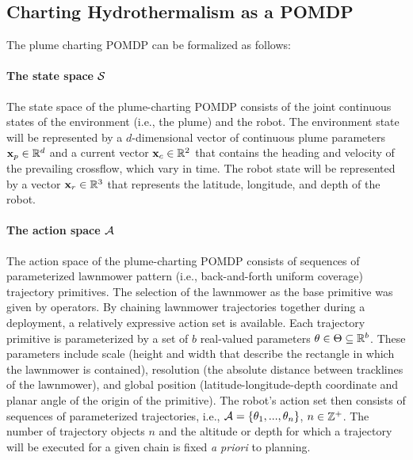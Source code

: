 \subsection{Charting Hydrothermalism as a POMDP}
\label{sec:pomdp}
The plume charting POMDP can be formalized as follows: 

\paragraph{The state space $\mathcal{S}$} The state space of the plume-charting POMDP consists of the joint continuous states of the environment (i.e., the plume) and the robot. The environment state will be represented by a $d$-dimensional vector of continuous plume parameters $\mathbf{x}_p \in \mathbb{R}^d$ and a current vector $\mathbf{x}_c \in \mathbb{R}^2$ that contains the heading and velocity of the prevailing crossflow, which vary in time. The robot state will be represented by a vector $\mathbf{x}_r \in \mathbb{R}^3$ that represents the latitude, longitude, and depth of the robot.

\paragraph{The action space $\mathcal{A}$} The action space of the plume-charting POMDP consists of sequences of parameterized lawnmower pattern (i.e., back-and-forth uniform coverage) trajectory primitives. The selection of the lawnmower as the base primitive was given by \Sentry operators. By chaining lawnmower trajectories together during a deployment, a relatively expressive action set is available. Each trajectory primitive is parameterized by a set of $b$ real-valued parameters $\theta \in \Theta \subseteq \mathbb{R}^b$. These parameters include scale (height and width that describe the rectangle in which the lawnmower is contained), resolution (the absolute distance between tracklines of the lawnmower), and global position (latitude-longitude-depth coordinate and planar angle of the origin of the primitive). The robot's action set then consists of sequences of parameterized trajectories, i.e., $\mathcal{A} = \{\theta_1,...,\theta_n\}$, $n \in \mathbb{Z}^+$. The number of trajectory objects $n$ and the altitude or depth for which a trajectory will be executed for a given chain is fixed \emph{a priori} to planning. 

